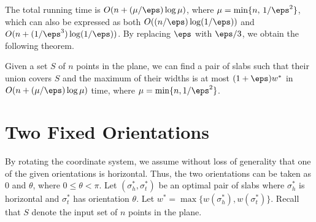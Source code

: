 The total running time is 
$O(n + (\mu/\eps)\log \mu )$, where $ \mu = \min\{n,\, 1/\eps^2\}$, 
which can also be expressed as both $O((n/\eps)\log(1/\eps))$ and $O(n + (1/\eps^3)\log(1/\eps))$. 
By replacing $\eps$ with $\eps/3$, we obtain the following theorem.





\begin{theorem}
    Given a set $S$ of $n$ points in the plane, we can find a pair of slabs such that their union covers $S$ and the maximum of their widths is at most $(1+\eps)w^*$ in $O(n + (\mu/\eps) \log \mu)$ time, where $\mu = \min \{n, 1/\eps^2 \}$.
\end{theorem}

\section{Two Fixed Orientations}
\label{sec:two_fixed}



By rotating the coordinate system, we assume without loss of generality that one of the given orientations is horizontal. Thus, the two orientations can be taken as $0$ and $\theta$, where $0 \leq \theta < \pi$.
Let $(\sigma_h^*, \sigma_t^* )$ be an optimal pair of slabs where $\sigma_h^*$ is horizontal and $\sigma_t^*$ has orientation $\theta$.
Let $w^* = \max \{w(\sigma_h^*), w(\sigma_t^*) \}$.
Recall that $S$ denote the input set of $n$ points in the plane.




